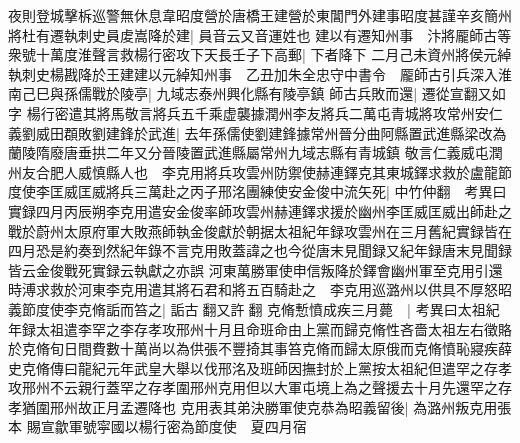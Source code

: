 夜則登城擊柝巡警無休息韋昭度營於唐橋王建營於東閶門外建事昭度甚謹辛亥簡州將杜有遷執刺史員䖍嵩降於建|{
	員音云又音運姓也}
建以有遷知州事　汴將龎師古等衆號十萬度淮聲言救楊行密攻下天長壬子下高郵|{
	下者降下}
二月己未資州將侯元綽執刺史楊戡降於王建建以元綽知州事　乙丑加朱全忠守中書令　龎師古引兵深入淮南己巳與孫儒戰於陵亭|{
	九域志泰州興化縣有陵亭鎮}
師古兵敗而還|{
	遷從宣翻又如字}
楊行密遣其將馬敬言將兵五千乘虚襲據潤州李友將兵二萬屯青城將攻常州安仁義劉威田頵敗劉建鋒於武進|{
	去年孫儒使劉建鋒據常州晉分曲阿縣置武進縣梁改為蘭陵隋廢唐垂拱二年又分晉陵置武進縣屬常州九域志縣有青城鎮}
敬言仁義威屯潤州友合肥人威慎縣人也　李克用將兵攻雲州防禦使赫連鐸克其東城鐸求救於盧龍節度使李匡威匡威將兵三萬赴之丙子邢洺團練使安金俊中流矢死|{
	中竹仲翻　考異曰實録四月丙辰朔李克用遣安金俊率師攻雲州赫連鐸求援於幽州李匡威匡威出師赴之戰於蔚州太原府軍大敗燕師執金俊獻於朝据太祖紀年録攻雲州在三月舊紀實録皆在四月恐是約奏到然紀年錄不言克用敗蓋諱之也今從唐末見聞録又紀年録唐末見聞録皆云金俊戰死實録云執獻之亦誤}
河東萬勝軍使申信叛降於鐸會幽州軍至克用引還　時溥求救於河東李克用遣其將石君和將五百騎赴之　李克用巡潞州以供具不厚怒昭義節度使李克脩詬而笞之|{
	詬古翻又許翻}
克脩慙憤成疾三月薨　|{
	考異曰太祖紀年録太祖遣李罕之李存孝攻邢州十月且命班命由上黨而歸克脩性吝嗇太祖左右徵賂於克脩旬日間費數十萬尚以為供張不豐掎其事笞克脩而歸太原俄而克脩憤恥寢疾薛史克脩傳曰龍紀元年武皇大舉以伐邢洺及班師因撫封於上黨按太祖紀但遣罕之存孝攻邢州不云親行蓋罕之存孝圍邢州克用但以大軍屯境上為之聲援去十月先還罕之存孝猶圍邢州故正月孟遷降也}
克用表其弟決勝軍使克恭為昭義留後|{
	為潞州叛克用張本}
賜宣歙軍號寜國以楊行密為節度使　夏四月宿

